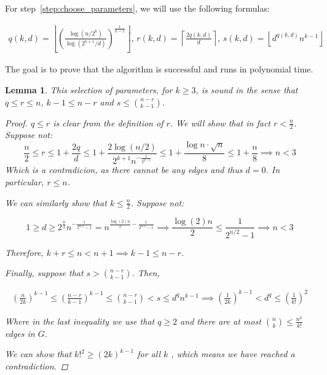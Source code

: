 \documentclass[12pt]{article}
\newtheorem{lemma}[thm]{Lemma}
\theoremstyle{remark}
\begin{document}
    For step~\ref{step:choose_parameters}, we will use the following formulas:

    \begin{align*}
                    q (k, d) = \left\lfloor \left(  \frac{\log (n/2^k)}{\log (2^{k+1}/d)} \right)^{\frac{1}{k-1}} \right\rfloor,\,
            r(k, d) = \left \lceil \frac{2q(k, d)}{d} \right \rceil,\,
            s(k, d) = \left\lfloor d^{q(k, d)} n^{k-1} \right\rfloor
    \end{align*}

    The goal is to prove that the algorithm is successful and runs in polynomial time.

    \begin{lemma}
        This selection of parameters, \color{red} for $k \geq 3$, \color{black} is sound in the sense that $q  \leq r \leq n$, $k - 1 \leq n - r$ and $s \leq \binom{n - r}{k - 1}$.

        \begin{proof}
            $q \leq r$ is clear from the definition of $r$.
            We will show that in fact $r < \frac{n}{2}$.
            Suppose not:
            \[
                \frac{n}{2} \leq r \leq 1 + \frac{2q}{d} \leq 1 + \frac{2 \log (n/2)}{2^{k+1}n^{-\frac{1}{2^{k-1}}}}
                \leq 1 + \frac{\log n \cdot \sqrt {n}}{8} \leq 1 + \frac{n}{8} \implies n < 3
            \]
            Which is a contradicion, as there cannot be any edges and thus $d = 0$.
            In particular, $r \leq n$.
     
            We can similarly show that $k \leq \frac{n}{2}$.
            Suppose not:
            
            \[
                1 \geq d \geq 2^{\frac{n}{2}} n^{- \frac{1}{2^{n/2}-1}}
                = n^{\frac{\log(2) n}{2} - \frac{1}{2^{n/2}-1}} \implies
                \frac{\log (2) n}{2} \leq \frac{1}{2^{n/2}-1} \implies n < 3
            \]

            Therefore, $k+r \leq n < n + 1 \implies k - 1 \leq n - r$.

            Finally, suppose that $s > \binom{n - r}{k - 1}$.
            Then,

            \begin{align*}
                \left( \frac{n}{2k} \right)^{k-1} \leq \left( \frac{n-r}{k-1} \right)^{k-1} \leq \binom{n - r}{k - 1} < s \leq d^q n^{k-1}
                \implies  \left( \frac{1}{2k} \right)^{k-1} < d^q \leq \left( \frac{1}{k!} \right)^2
            \end{align*}
            
            Where in the last inequality we use that $q \geq 2$ and there are at most
            $\binom{n}{k} \leq \frac{n^k}{k!}$ edges in $G$.

            We can show that \color{red} $k!^2 \geq (2k)^{k-1}$ for all $k$ %
            \color{black}, which means we have reached a contradiction.

        \end{proof}

    \end{lemma}
\end{document}
